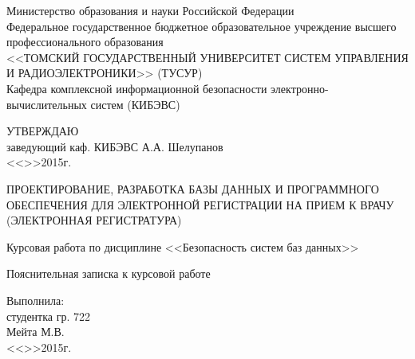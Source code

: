 \newpage
{}

\begin{center}
 Министерство образования и науки Российской Федерации\\
 Федеральное государственное бюджетное образовательное учреждение высшего профессионального образования\\
 <<ТОМСКИЙ ГОСУДАРСТВЕННЫЙ УНИВЕРСИТЕТ СИСТЕМ УПРАВЛЕНИЯ И РАДИОЭЛЕКТРОНИКИ>> (ТУСУР)\\
 Кафедра комплексной информационной безопасности электронно-вычислительных систем (КИБЭВС)\\
\end{center}

\vfill

\begin{flushright}
\begin{minipage}{0.45\textwidth}
 \begin{flushleft}
  УТВЕРЖДАЮ\\
  заведующий каф. КИБЭВС
  \underline{\hspace{3cm}}А.А. Шелупанов \\
  <<\underline{\hspace{1cm}}>>\underline{\hspace{3cm}}2015г.\\
 \end{flushleft}
\end{minipage}
\end{flushright}

\vfill

\begin{center}
ПРОЕКТИРОВАНИЕ, РАЗРАБОТКА БАЗЫ ДАННЫХ И ПРОГРАММНОГО ОБЕСПЕЧЕНИЯ ДЛЯ ЭЛЕКТРОННОЙ РЕГИСТРАЦИИ НА ПРИЕМ К ВРАЧУ 
(ЭЛЕКТРОННАЯ РЕГИСТРАТУРА)

Курсовая работа по дисциплине <<Безопасность систем баз данных>>

Пояснительная записка к курсовой работе
\end{center}

\vfill
\begin{flushright}
\begin{minipage}{0.45\textwidth}
 \begin{flushleft}
  Выполнила: \\
  студентка гр. 722 \\
  \underline{\hspace{3cm}}Мейта М.В. \\
  <<\underline{\hspace{1cm}}>>\underline{\hspace{3cm}}2015г.\\
 \end{flushleft}
\end{minipage}
\end{flushright}

